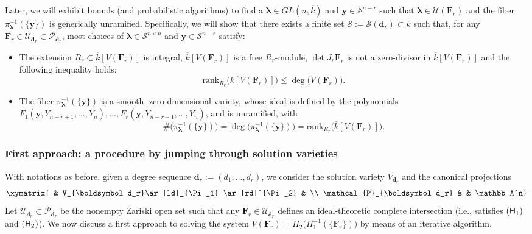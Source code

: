 \documentclass[pdflatex,sn-basic]{sn-jnl}%
\theoremstyle{thmstyleone}%
\theoremstyle{thmstyletwo}%
\theoremstyle{thmstylethree}%
\theoremstyle{definition}
\numberwithin{equation}{section}
\newcommand{\bfs}{\boldsymbol}
\newcommand{\A}{\mathbb A}
\begin{document}
Later, we will exhibit bounds (and probabilistic algorithms) to find
a ${\bfs\lambda}\in GL(n,\overline{k})$ and $\bfs y\in\A^{n-r}$
such that $\bfs\lambda\in\mathcal{U}(\bfs F_r)$ and the fiber
$\pi_{\bfs\lambda}^{-1}(\{\bfs y\})$ is generically unramified.
Specifically, we will show that there exists a finite set
$\mathcal{S}:=\mathcal{S}(\bfs d_r)\subset \overline{k}$ such that,
for any $\bfs
F_r\in\mathcal{U}_{\bfs d_r}\subset\mathcal{P}_{\bfs d_r}$,
most choices of $\bfs\lambda\in\mathcal{S}^{n\times n}$ and $\bfs y\in
\mathcal{S}^{n-r}$ satisfy:
%
\begin{itemize}
  \item The extension $R_r\subset\overline{k}
[V(\bfs F_r)]$ is integral, $\overline{k} [V(\bfs F_r)]$ is a free
$R_r$-module, $\det J_r\bfs F_r$ is not a zero-divisor in
$\overline{k} [V(\bfs F_r)]$ and the following inequality holds:
%
$$\mathrm{rank}_{R_r}\big(\overline{k}
[V(\bfs F_r)]\big)\le \deg\big(V(\bfs F_r)\big).$$
%
\item The fiber $\pi_{\bfs\lambda}^{-1}(\{\bfs y\})$ is a smooth,
zero-dimensional variety, whose ideal is defined by the polynomials
$F_1(\bfs y, Y_{n-r+1},\ldots,Y_n),\ldots,F_r(\bfs y,
Y_{n-r+1},\ldots,Y_n)$, and is unramified, with
%
$$\#\big(\pi_{\bfs\lambda}^{-1}(\{\bfs y\})\big)=\deg\big(\pi_{\bfs\lambda}^{-1}(\{\bfs y\})\big)
=\mathrm{rank}_{R_r}\big(\overline{k}
[V(\bfs F_r)]\big).$$
\end{itemize}
%
%
\subsubsection{First approach: a procedure by jumping through solution
varieties}
\label{subsec: first approach}
%
With notations as before, given a degree sequence $\bfs
d_r:=(d_1,\ldots,d_r)$, we consider the solution variety $V_{\bfs
d_r}$ and the canonical projections
%
$$\xymatrix{
 & V_{\bfs d_r}\ar[ld]_{\Pi_1} \ar[rd]^{\Pi_2} & \\
\mathcal{P}_{\bfs d_r}  & & \A^n}$$
%
Let $\mathcal{U}_{\bfs d_r}\subset\mathcal{P}_{\bfs d_r}$ be the
nonempty Zariski open set such that any $\bfs
F_r\in\mathcal{U}_{\bfs d_r}$ defines an ideal-theoretic complete
intersection (i.e., satisfies $({\sf H}_1)$ and $({\sf H}_2)$). We
now discuss a first approach to solving the system $V(\bfs
F_r)=\Pi_2\big(\Pi_1^{-1}(\{\bfs F_r\})\big)$ by means of an
iterative algorithm.
\end{document}
